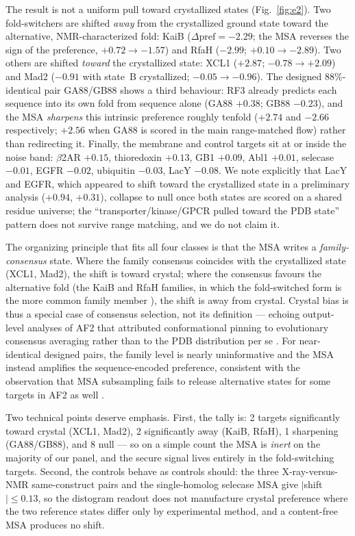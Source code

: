 \documentclass[11pt]{article}
\newcommand{\pref}{\mathrm{pref}}
\begin{document}
The result is not a uniform pull toward crystallized states
(Fig.~\ref{fig:e2}). Two fold-switchers are shifted \emph{away} from the
crystallized ground state toward the alternative, NMR-characterized fold:
KaiB ($\Delta\pref = -2.29$; the MSA reverses the sign of the preference,
$+0.72 \rightarrow -1.57$) and RfaH ($-2.99$; $+0.10 \rightarrow -2.89$).
Two others are shifted \emph{toward} the crystallized state: XCL1
($+2.87$; $-0.78 \rightarrow +2.09$) and Mad2 ($-0.91$ with state~B
crystallized; $-0.05 \rightarrow -0.96$). The designed 88\%-identical pair
GA88/GB88 shows a third behaviour: RF3 already predicts each sequence into
its own fold from sequence alone (GA88 $+0.38$; GB88 $-0.23$), and the MSA
\emph{sharpens} this intrinsic preference roughly tenfold
($+2.74$ and $-2.66$ respectively; $+2.56$ when GA88 is scored in the main
range-matched flow) rather than redirecting it. Finally, the membrane and
control targets sit at or inside the noise band: $\beta$2AR $+0.15$,
thioredoxin $+0.13$, GB1 $+0.09$, Abl1 $+0.01$, selecase $-0.01$, EGFR
$-0.02$, ubiquitin $-0.03$, LacY $-0.08$. We note explicitly that LacY and
EGFR, which appeared to shift toward the crystallized state in a preliminary
analysis ($+0.94$, $+0.31$), collapse to null once both states are scored on
a shared residue universe; the ``transporter/kinase/GPCR pulled toward the
PDB state'' pattern does not survive range matching, and we do not claim it.

The organizing principle that fits all four classes is that the MSA writes a
\emph{family-consensus} state. Where the family consensus coincides with the
crystallized state (XCL1, Mad2), the shift is toward crystal; where the
consensus favours the alternative fold (the KaiB and RfaH families, in which
the fold-switched form is the more common family member
\cite{chang2015,burmann2012}), the shift is away from crystal. Crystal bias
is thus a special case of consensus selection, not its definition --- echoing
output-level analyses of AF2 that attributed conformational pinning to
evolutionary consensus averaging rather than to the PDB distribution per se
\cite{saldano2022}. For near-identical designed pairs, the family level is
nearly uninformative and the MSA instead amplifies the sequence-encoded
preference, consistent with the observation that MSA subsampling fails to
release alternative states for some targets in AF2 as well \cite{stein2022}.

Two technical points deserve emphasis. First, the tally is: 2 targets
significantly toward crystal (XCL1, Mad2), 2 significantly away (KaiB,
RfaH), 1 sharpening (GA88/GB88), and 8 null --- so on a simple count the
MSA is \emph{inert} on the majority of our panel, and the secure signal
lives entirely in the fold-switching targets. Second, the controls behave
as controls should: the three X-ray-versus-NMR same-construct pairs and the
single-homolog selecase MSA give $|$shift$| \le 0.13$, so the distogram
readout does not manufacture crystal preference where the two reference
states differ only by experimental method, and a content-free MSA produces
no shift.
\end{document}
